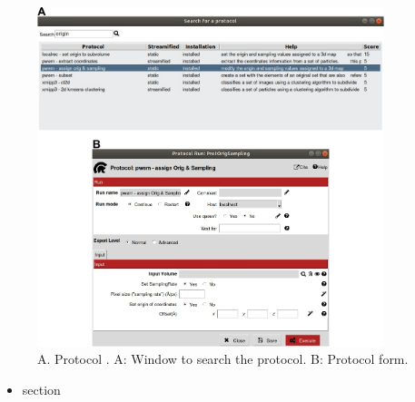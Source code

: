 \begin{itemize}
  \begin{figure}[H]
    \centering 
    \captionsetup{width=.7\linewidth} 
    \includegraphics[width=0.90\textwidth]{Images_appendix/Fig301.pdf}
    \caption{A. Protocol . A: Window to search the protocol. B: Protocol form.}
    \label{fig:app_protocol_assign_orig_and_sampling}
   \end{figure}
  
  \begin{itemize}
   \item {} section
  


\end{itemize}
\end{itemize}
